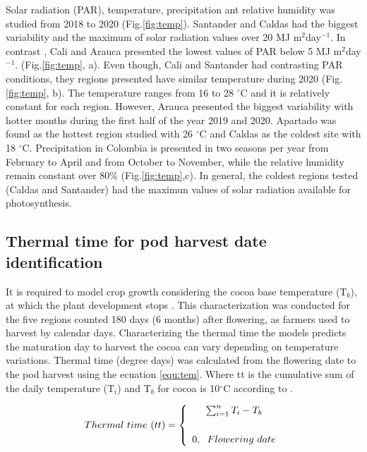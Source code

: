 \documentclass[gene,journal,article,submit,moreauthors,pdftex]{Definitions/mdpi}
\begin{document}
Solar radiation (PAR), temperature, precipitation ant relative humidity was studied from 2018 to 2020 (Fig.\ref{fig:temp}). Santander and Caldas had the biggest variability and the maximum of solar radiation values over 20 MJ m$^{2}$day$^{-1}$. In contrast , Cali and Arauca presented the lowest values of PAR below 5 MJ m$^{2}$day$^{-1}$. (Fig.\ref{fig:temp}, a).  Even though, Cali and Santander had contrasting PAR conditions, they regions presented  have similar temperature during 2020 (Fig.\ref{fig:temp}, b). The temperature ranges from 16 to 28 $^\circ$C and it is relatively constant for each region. However, Arauca presented the biggest variability with hotter months during the first half of the year 2019 and 2020.  Apartado was found as the hottest region studied with 26 $^\circ$C and Caldas as the coldest site with 18 $^\circ$C.  Precipitation in Colombia is presented in two seasons per year from February to April and from October to November, while the relative humidity remain constant over 80\% (Fig.\ref{fig:temp},c). In general, the coldest regions tested (Caldas and Santander) had the maximun values of solar radiation available for photosynthesis. 





\subsection{Thermal time for pod harvest date identification}
It is required to model crop growth  considering the cocoa base temperature (T$_{b}$), at which the plant development stops \citep{Ritchie1991}. This characterization was conducted for the five regions counted 180 days (6 months) after flowering, as farmers used to harvest by calendar days. Characterizing the thermal time the models predicts the maturation day to harvest the cocoa can vary depending on temperature variations. Thermal time (degree days) was calculated  from the flowering date to the pod harvest  using the ecuation \ref{equ:tem}. Where tt is the cumulative sum of the daily temperature (T$_{i}$) and T$_{b}$ for cocoa is 10$^\circ$C according to \cite{lahive2019}.

\begin{equation}
Thermal~time~(tt) = \left\lbrace\begin{array}{c} \sum_{i=1}^{n} T_{i} - T_{b} \\
\vspace{0.2cm}\\ 
0,\hspace{0.2cm} Flowering~date\end{array}\right.
\label{equ:tem}
\end{equation}
\end{document}
